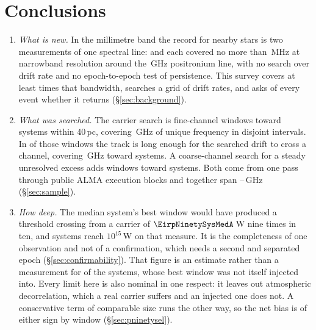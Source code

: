 \section{Conclusions}
\label{sec:conclusions}

\begin{enumerate}[leftmargin=1.6em,itemsep=4pt,topsep=4pt,parsep=0pt]

\item \emph{What is new.} In the millimetre band the record for nearby stars
is two measurements of one spectral line: \citet{Steffes1994} and
\citet{Mauersberger1996} each covered no more than \SbPriorBandMHz\,MHz at
narrowband resolution around the \SbPriorFreqGHz\,GHz positronium line, with
no search over drift rate and
no epoch-to-epoch test of persistence. This survey covers at
least \SbPriorRatio{} times that bandwidth, searches a grid of drift rates,
and asks of every event whether it returns (\S\ref{sec:background}).

\item \emph{What was searched.} The carrier search is \NWinA{} fine-channel
windows toward \NSysClassA{} systems within 40\,pc, covering \CvUnionA\,GHz
of unique frequency in \CovNIslands{} disjoint intervals. In \EdrNWinA{} of
those windows the track is long enough for the searched drift to cross a
channel, covering \EdrUnionGHz\,GHz toward \EdrNSys{} systems. A coarse-channel
search for a steady unresolved excess adds \NWinB{} windows toward
\PrSysClassB{} systems. Both come from one pass through \NEB{} public ALMA
execution blocks and together span \SurvFreqLo--\SurvFreqHi\,GHz
(\S\ref{sec:sample}).

\item \emph{How deep.} The median system's best window would have produced a
threshold crossing from a carrier of $\EirpNinetySysMedA$\,W nine times in
ten, and \NSysEfifteen{} systems reach $10^{15}$\,W on that measure. It is the
completeness of one observation and not of a confirmation, which needs a
second and separated epoch (\S\ref{sec:confirmability}). That figure is an
estimate rather than a
measurement for \SmcNEstSys{} of the \NSysClassA{} systems, whose best window
was not itself injected into. Every limit here is also nominal in one
respect: it leaves out atmospheric decorrelation, which a real carrier
suffers and an injected one does not. A conservative term of comparable size
runs the other way, so the net bias is of either sign by window
(\S\ref{sec:pninetysel}).


\end{enumerate}
